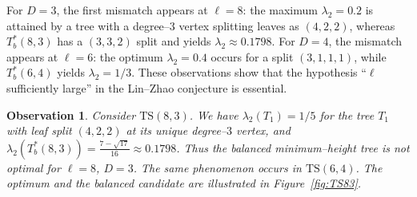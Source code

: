 \documentclass[11pt]{article}
\newtheorem{observation}[theorem]{Observation}
\theoremstyle{definition}
\theoremstyle{remark}
\begin{document}
For $D=3$, the first mismatch appears at $\ell=8$: the maximum $\lambda_2=0.2$ is attained by a tree with a degree--$3$ vertex splitting leaves as $(4,2,2)$, whereas $T_b^*(8,3)$ has a $(3,3,2)$ split and yields $\lambda_2\approx 0.1798$.
For $D=4$, the mismatch appears at $\ell=6$: the optimum $\lambda_2=0.4$ occurs for a split $(3,1,1,1)$, while $T_b^*(6,4)$ yields $\lambda_2=1/3$.
These observations show that the hypothesis ``$\ell$ sufficiently large'' in the Lin--Zhao conjecture is essential.

\begin{observation}\label{obs:mismatch}
Consider $\mathrm{TS}(8,3)$.
We have $\lambda_2(T_1)=1/5$ for the tree $T_1$ with leaf split $(4,2,2)$ at its unique degree--$3$ vertex, and $\lambda_2(T_b^*(8,3))=\frac{7-\sqrt{17}}{16}\approx 0.1798$.
Thus the balanced minimum--height tree is not optimal for $\ell=8$, $D=3$.
The same phenomenon occurs in $\mathrm{TS}(6,4)$.
The optimum and the balanced candidate are illustrated in Figure~\ref{fig:TS83}.
\end{observation}
\end{document}
